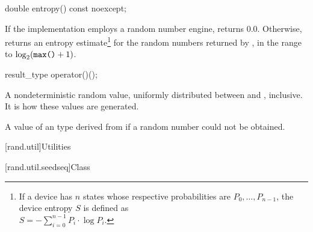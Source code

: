 %
\begin{itemdecl}
double entropy() const noexcept;
\end{itemdecl}

\begin{itemdescr}
\pnum\returns If the implementation employs a random number engine,
 returns $0.0$.
 Otherwise, returns an entropy estimate\footnote{If a device has $n$ states
   whose respective probabilities are
   $ P_0, \ldots, P_{n-1} $,
   the device entropy $S$ is defined as\\
   $ S = - \sum_{i=0}^{n-1} P_i \cdot \log P_i $.}
 for the random numbers returned by ,
 in the range
 to
   $\log_2( \texttt{\protect max()}+1)$.
\end{itemdescr}

%
\begin{itemdecl}
result_type operator()();
\end{itemdecl}

\begin{itemdescr}
\pnum\returns A nondeterministic random value,
 uniformly distributed
 between  and ,
 inclusive.
 It is 
 how these values are generated.

\pnum
\throws A value of an 
 type derived from 
 if a random number could not be obtained.
\end{itemdescr}




[rand.util]{Utilities}%
%


[rand.util.seedseq]{Class }%

